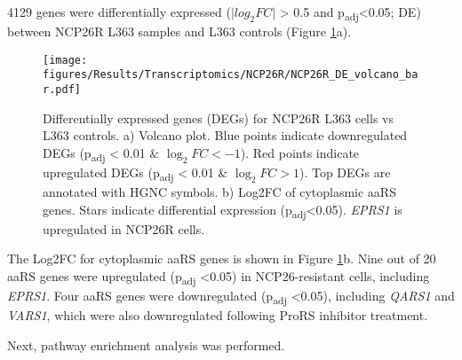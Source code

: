 4129 genes were differentially expressed ($\lvert log_{2}FC \rvert$ > 0.5 and p\textsubscript{adj}<0.05; DE) between NCP26R L363 samples and L363 controls (Figure \ref{fig:NCP26R_DE}a).
\begin{figure}[htb]
\centering
\texttt{[image: figures/Results/Transcriptomics/NCP26R/NCP26R\_DE\_volcano\_bar.pdf]}
\caption[NCP26R bulk RNA-seq differentially expression]{Differentially expressed genes (DEGs) for NCP26R L363 cells vs L363 controls.
a) Volcano plot. Blue points indicate downregulated DEGs (p\textsubscript{adj} < 0.01 \& $\log_{2}FC < -1$).
Red points indicate upregulated DEGs (p\textsubscript{adj} < 0.01 \& $\log_{2}FC > 1$).
Top DEGs are annotated with HGNC symbols.
b) Log2FC of cytoplasmic aaRS genes.
Stars indicate differential expression (p\textsubscript{adj}<0.05).
\textit{EPRS1} is upregulated in NCP26R cells.
}
\label{fig:NCP26R_DE}
\end{figure}
The Log2FC for cytoplasmic aaRS genes is shown in Figure \ref{fig:NCP26R_DE}b.
Nine out of 20 aaRS genes were upregulated (p\textsubscript{adj} <0.05) in NCP26-resistant cells, including \textit{EPRS1}.
Four aaRS genes were downregulated (p\textsubscript{adj} <0.05), including \textit{QARS1} and \textit{VARS1}, which were also downregulated following ProRS inhibitor treatment.

Next, pathway enrichment analysis was performed.

